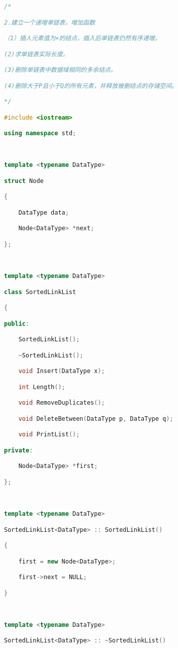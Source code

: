 \begin{lstlisting}[language=C++]
/*

2.建立一个递增单链表，增加函数

（1）插人元素值为×的结点，插入后单链表仍然有序递增。

(2)求单链表实际长度。

(3)删除单链表中数据域相同的多余结点。

(4)删除大于P且小于Q的所有元素，并释放被删结点的存储空间。

*/

#include <iostream>

using namespace std;

  

template <typename DataType>

struct Node

{

    DataType data;

    Node<DataType> *next;

};

  

template <typename DataType>

class SortedLinkList

{

public:

    SortedLinkList();

    ~SortedLinkList();

    void Insert(DataType x);

    int Length();

    void RemoveDuplicates();

    void DeleteBetween(DataType p, DataType q);

    void PrintList();

private:

    Node<DataType> *first;

};

  

template <typename DataType>

SortedLinkList<DataType> :: SortedLinkList()

{

    first = new Node<DataType>;

    first->next = NULL;

}  

  

template <typename DataType>

SortedLinkList<DataType> :: ~SortedLinkList()


\end{lstlisting}
